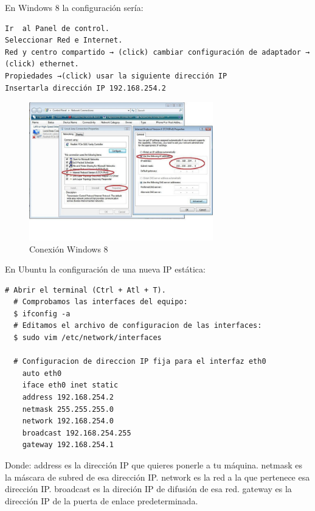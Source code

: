 \begin{itemize}
En Windows 8 la configuración sería:

\renewcommand{\lstlistingname}{Configuración}
\begin{lstlisting}[caption= Windows 8, label={lst:config_w8}]
Ir  al Panel de control.
Seleccionar Red e Internet.
Red y centro compartido → (click) cambiar configuración de adaptador → (click) ethernet.
Propiedades →(click) usar la siguiente dirección IP
Insertarla dirección IP 192.168.254.2
\end{lstlisting}

\begin{figure} [hbtp]
\begin{center}
  \includegraphics[width=8cm]{img/cap3/3_4/conexion}
\end{center}
\caption{Conexión Windows 8}
\label{fig:w8}
\end{figure}

En Ubuntu la configuración de una nueva IP estática:

\renewcommand{\lstlistingname}{Configuración}
\begin{lstlisting}[caption= Ubuntu, label={lst:config_ubuntu}]
  # Abrir el terminal (Ctrl + Atl + T).
  # Comprobamos las interfaces del equipo:  
  $ ifconfig -a
  # Editamos el archivo de configuracion de las interfaces:  
  $ sudo vim /etc/network/interfaces

  # Configuracion de direccion IP fija para el interfaz eth0
    auto eth0
    iface eth0 inet static
    address 192.168.254.2
    netmask 255.255.255.0
    network 192.168.254.0
    broadcast 192.168.254.255
    gateway 192.168.254.1
\end{lstlisting}

  Donde:
    \subsubitem address es la dirección IP que quieres ponerle a tu máquina.
    \subsubitem netmask es la máscara de subred de esa dirección IP.
    \subsubitem network es la red a la que pertenece esa dirección IP.
    \subsubitem broadcast es la direción IP de difusión de esa red.
    \subsubitem gateway es la dirección IP de la puerta de enlace predeterminada.


\end{itemize}
